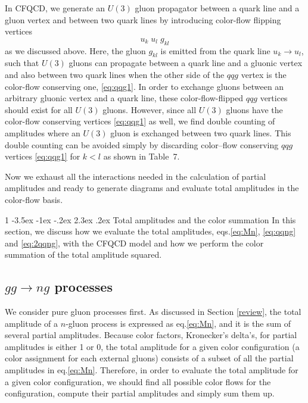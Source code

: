 \documentclass[a4paper,11pt]{article}
\makeatletter
\renewcommand{\section}{%
  \@startsection{section}%
   {1}%
   {\z@}%
   {-3.5ex \@plus -1ex \@minus -.2ex}%
   {2.3ex \@plus.2ex}%
   {\normalfont\large\bfseries}%
}%
\makeatother
\begin{document}
In CFQCD, we generate an $U(3)$ gluon propagator between a quark line and
a gluon vertex and between two quark lines by introducing color-flow
flipping vertices
\begin{equation}
 u_k\; u_l\; g_{kl}
  \label{eq:interaction2}
\end{equation}
as we discussed above. Here, the gluon $g_{kl}$ is emitted from the quark line
 $u_k\rightarrow u_l$, such that $U(3)$ gluons can propagate
 between a quark line and a gluonic vertex and also between
 two quark lines when the other side of the $qqg$ vertex is the
 color-flow conserving one, \eqref{eq:qqg1}. In order to exchange gluons between an arbitrary gluonic vertex and a quark line, these color-flow-flipped $qqg$ vertices should exist for all $U(3)$ gluons. However, since all $U(3)$ gluons have the color-flow conserving vertices \eqref{eq:qqg1} as well, we find double counting of amplitudes where an $U(3)$ gluon is exchanged between two quark lines. This double counting can be avoided simply by discarding color--flow conserving $qqg$ vertices \eqref{eq:qqg1} for $k<l$ as shown in Table~7. 

Now we exhaust all the interactions needed in
the calculation of partial amplitudes and ready to generate diagrams and evaluate total
amplitudes in the color-flow
basis.

\section{Total amplitudes and the color summation}
In this section, we discuss how we evaluate the total amplitudes,
eqs.\eqref{eq:Mn}, \eqref{eq:qqng} and \eqref{eq:2qqng}, with the
CFQCD model and how we perform the color summation of the total
amplitude squared.

\subsection{$gg\rightarrow ng$ processes}
 We consider pure gluon processes first. As discussed in Section
\ref{review}, the total amplitude of a $n$-gluon process is expressed as
eq.\eqref{eq:Mn}, and it is the sum of several partial
amplitudes. Because color factors, Kronecker's delta's, for partial
amplitudes is either 1 or 0, the total amplitude for a given color
configuration (a color assignment for each external gluons) consists of a subset of all the partial amplitudes in
eq.\eqref{eq:Mn}.  Therefore, in order to evaluate the total amplitude for a given
color configuration, we should find all possible color flows for the
configuration, compute their partial amplitudes and simply sum
them up.
\end{document}
